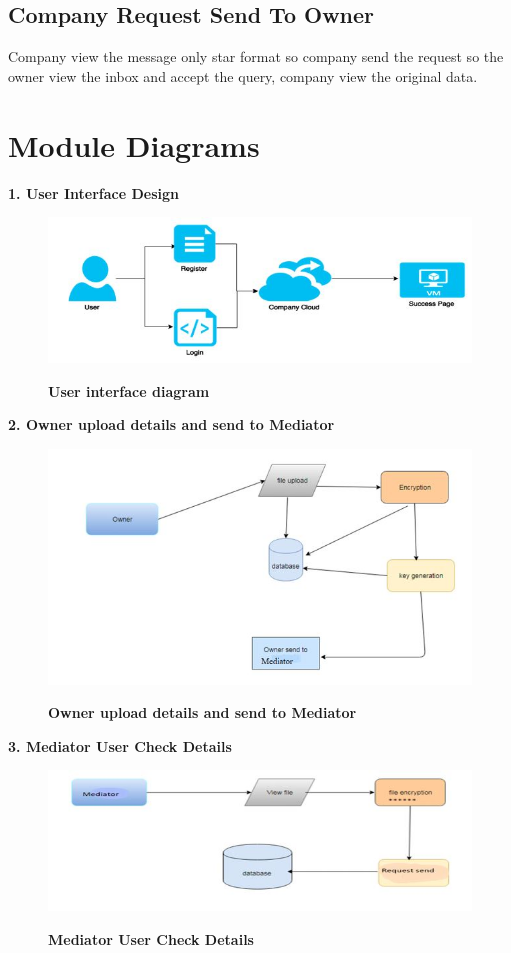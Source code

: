\documentclass[BTech]{srmuthesis}
\begin{document}
\subsection{Company Request Send To Owner}
Company view the message only star format so company send the request so the owner view the inbox and accept the query, company view the original data.
\section{Module Diagrams}
\textbf{1. User Interface Design}
\begin{figure}[H]
\includegraphics[scale=0.7]{1.jpg}
\label{fig:1}\hspace{10mm}
\caption{\textbf{User interface diagram}}
\end{figure}
\textbf{2. Owner upload details and send to Mediator}
\begin{figure}[H]
\includegraphics[scale=0.7]{2.jpg}
\label{fig:1}\hspace{10mm}
\caption{\textbf{Owner upload details and send to Mediator}}
\end{figure}
\textbf{3. Mediator User Check Details}
\begin{figure}[H]
\includegraphics[scale=0.7]{3.jpg}
\label{fig:1}\hspace{10mm}
\caption{\textbf{Mediator User Check Details}}
\end{figure}
\end{document}
